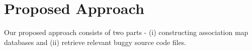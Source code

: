 \documentclass{sig-alternate}
\begin{document}
\section{Proposed Approach}\label{sec:proposedApproach}
Our proposed approach consists of two parts - (i) constructing association map databases and (ii) retrieve relevant buggy source code files. 
\end{document}
